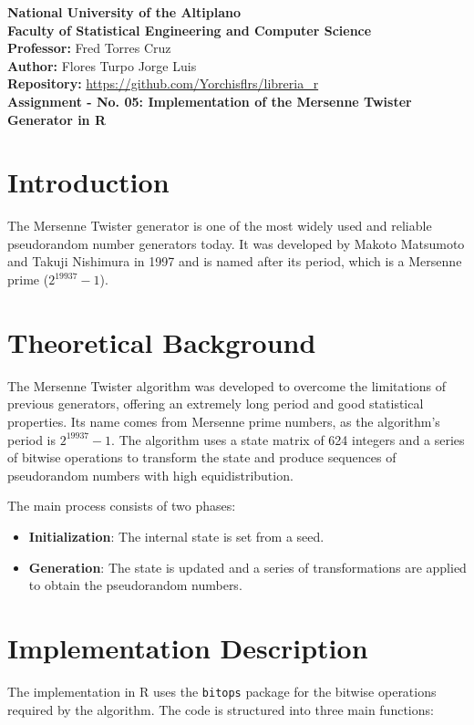 \documentclass[12pt]{article}
\begin{document}
\noindent \textbf{National University of the Altiplano\\
Faculty of Statistical Engineering and Computer Science\\
Professor: } Fred Torres Cruz\\
\textbf{Author: } Flores Turpo Jorge Luis\\
\textbf{Repository: } \url{https://github.com/Yorchisflrs/libreria_r}\\

\vspace{5mm}
\noindent\textbf{Assignment - No. 05: Implementation of the Mersenne Twister Generator in R}\\

\section{Introduction}
The Mersenne Twister generator is one of the most widely used and reliable pseudorandom number generators today. It was developed by Makoto Matsumoto and Takuji Nishimura in 1997 and is named after its period, which is a Mersenne prime ($2^{19937}-1$).

\section{Theoretical Background}
The Mersenne Twister algorithm was developed to overcome the limitations of previous generators, offering an extremely long period and good statistical properties. Its name comes from Mersenne prime numbers, as the algorithm's period is $2^{19937}-1$. The algorithm uses a state matrix of 624 integers and a series of bitwise operations to transform the state and produce sequences of pseudorandom numbers with high equidistribution.

The main process consists of two phases:
\begin{itemize}
    \item \textbf{Initialization}: The internal state is set from a seed.
    \item \textbf{Generation}: The state is updated and a series of transformations are applied to obtain the pseudorandom numbers.
\end{itemize}

\section{Implementation Description}
The implementation in R uses the \texttt{bitops} package for the bitwise operations required by the algorithm. The code is structured into three main functions:
\end{document}
